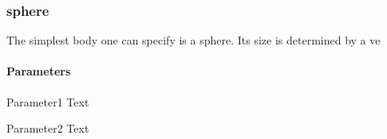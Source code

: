 \subsubsection{sphere}
The simplest body one can specify is a sphere. Its size is determined by a ve

\paragraph{Parameters}
\begin{description}
 \item{Parameter1} Text
 \item{Parameter2} Text
\end{description}
